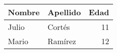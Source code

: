 \documentclass{article} %
\begin{document}
	
\begin{tabular}{llr} \toprule
	Nombre & Apellido & Edad \\ \midrule
	Julio & Cortés & 11 \\
	Mario & Ramírez & 12 \\ \bottomrule
\end{tabular}
\end{document}
